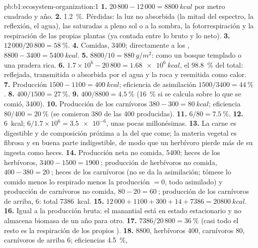 \begin{solution}{pb:b1:ecosystem-organization:1}
\textbf{1.} $20\,800 - 12\,000 = \qty{8800}{kcal}$ por metro cuadrado y
año.
\textbf{2.} \qty{1.2}{\%}. Pérdidas: la luz no absorbida (la mitad del
espectro, la reflexión, el agua), las  saturadas a pleno sol o a la
sombra, la fotorrespiración y la respiración de las propias plantas (ya
contada entre lo bruto y lo neto).
\textbf{3.} $12\,000/20\,800 = \qty{58}{\%}$.
\textbf{4.} Comidas, \qty{3400}{}; directamente a los ,
$8800 - 3400 = \qty{5400}{kcal}$.
\textbf{5.} $8800/10 = \qty{880}{g/m^2}$: como un bosque templado o una
pradera rica.
\textbf{6.} $1.7\times 10^6 - 20\,800 = \qty{1.68e6}{kcal}$, el \qty{98.8}{\%}
del total: reflejada, transmitida o absorbida por el agua y la roca y
reemitida como calor.
\textbf{7.} Producción $1500 - 1100 = \qty{400}{kcal}$; eficiencia de
asimilación $1500/3400 = \qty{44}{\%}$.
\textbf{8.} $400/1500 = \qty{27}{\%}$.
\textbf{9.} $400/8800 = \qty{4.5}{\%}$ (\qty{16}{\%} si se calcula sobre lo
que se comió, \qty{3400}{}).
\textbf{10.} Producción de los carnívoros $380 - 300 = \qty{80}{kcal}$;
eficiencia $80/400 = \qty{20}{\%}$ (se comieron \qty{380}{} de las
\qty{400}{} producidas).
\textbf{11.} $6/80 = \qty{7.5}{\%}$.
\textbf{12.} \qty{6}{kcal}; $6/1.7\times 10^6 = \num{3.5e-6}$, unas pocas
millonésimas.
\textbf{13.} La carne es digestible y de composición próxima a la del que
come; la materia vegetal es fibrosa y en buena parte indigestible, de modo
que un herbívoro pierde más de su ingesta como heces.
\textbf{14.} Producción neta no comida, \qty{5400}{}; heces de los
herbívoros, $3400 - 1500 = \qty{1900}{}$; producción de herbívoros no comida,
$400 - 380 = \qty{20}{}$; heces de los carnívoros (no se da la asimilación;
tómese lo comido menos lo respirado menos la producción $= 0$, todo
asimilado) y producción de carnívoros no comida, $80 - 20 = \qty{60}{}$;
producción de los carnívoros de arriba, \qty{6}{}: total \qty{7386}{kcal}.
\textbf{15.} $12\,000 + 1100 + 300 + 14 + 7386 = \qty{20800}{kcal}$.
\textbf{16.} Igual a la producción bruta: el manantial está en estado
estacionario y no almacena biomasa de un año para otro.
\textbf{17.} $7386/20\,800 = \qty{36}{\%}$ (casi todo el resto es la
respiración de los propios ).
\textbf{18.}  \qty{8800}{}, herbívoros \qty{400}{}, carnívoros
\qty{80}{}, carnívoros de arriba \qty{6}{}; eficiencias \qty{4.5}{\%},

\end{solution}
